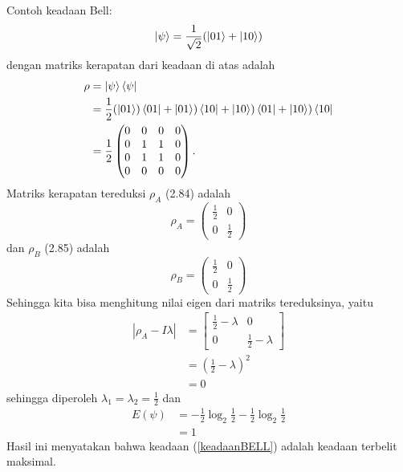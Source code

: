 Contoh keadaan Bell:
\begin{equation}
	\ket{\psi}=\frac{1}{\sqrt{2}}(\ket{01}+\ket{10}) \label{keadaanBELL}
\end{equation}
dengan matriks kerapatan dari keadaan di atas adalah
\begin{equation}
	\begin{aligned}
		\rho
		&=\ket{\psi}\bra{\psi}\\
		&=\frac{1}{2}(\ket{01})\bra{01}+\ket{01})\bra{10}+\ket{10})\bra{01}+\ket{10})\bra{10}\\
		&=\frac{1}{2}
		\begin{pmatrix}
			0&0&0&0\\
			0&1&1&0\\
			0&1&1&0\\
			0&0&0&0
		\end{pmatrix}.
	\end{aligned}
\end{equation}
Matriks kerapatan tereduksi $\rho_{A}$ (2.84) adalah
\begin{equation}
	\rho_A=
	\begin{pmatrix}
		\frac{1}{2}&0\\
		0&\frac{1}{2}
	\end{pmatrix}
\end{equation}
dan $\rho_{B}$ (2.85) adalah
\begin{equation}
	\rho_B=
	\begin{pmatrix}
		\frac{1}{2}&0\\
		0&\frac{1}{2}
	\end{pmatrix}
\end{equation}
Sehingga kita bisa menghitung nilai eigen dari matriks tereduksinya, yaitu
\begin{equation}
	\begin{aligned}
		|\rho_{A}-I\lambda|
		&=
		\begin{bmatrix}
			\frac{1}{2}-\lambda&0\\
			0&\frac{1}{2}-\lambda
		\end{bmatrix}\\
		&=(\frac{1}{2}-\lambda)^2\\
		&=0
	\end{aligned}
\end{equation}
sehingga diperoleh $\lambda_1=\lambda_2=\frac{1}{2}$
dan
\begin{equation}
	\begin{aligned}
		E(\psi)
		&=-\frac{1}{2}\log_2\frac{1}{2}-\frac{1}{2}\log_2\frac{1}{2}\\
		&=1
	\end{aligned}
\end{equation}
Hasil ini menyatakan bahwa keadaan (\ref{keadaanBELL}) adalah keadaan terbelit maksimal.
	
